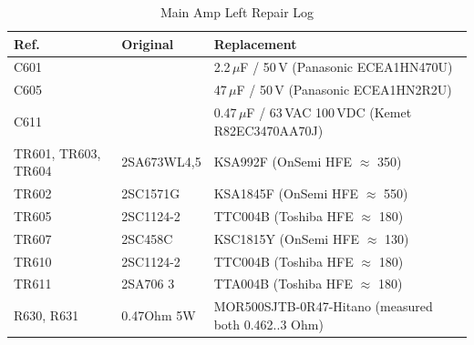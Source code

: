\documentclass[]{article}
\begin{document}
\begin{table}[H]
	\centering
	\caption{Main Amp Left Repair Log}
	\label{tab:repair_log_main_left}
	\begin{tabular}{|l|l|l|}
		\hline
		\textbf{Ref.} & \textbf{Original} & \textbf{Replacement} \\
		\hline
		C601 &  &   2.2\,$\mu$F / 50\,V (Panasonic ECEA1HN470U) \\
        C605 &  &   47\,$\mu$F / 50\,V (Panasonic ECEA1HN2R2U)\\ 
		C611 &  &   0.47\,$\mu$F / 63\,VAC 100\,VDC (Kemet R82EC3470AA70J) \\
        
		TR601, TR603, TR604 & 2SA673WL4,5 & KSA992F (OnSemi HFE $\approx$ 350) \\
                TR602 & 2SC1571G & KSA1845F (OnSemi HFE $\approx$ 550) \\
                TR605 & 2SC1124-2 & TTC004B (Toshiba HFE $\approx$ 180) \\
                TR607 & 2SC458C & KSC1815Y (OnSemi HFE $\approx$ 130)\\
                TR610 & 2SC1124-2 & TTC004B  (Toshiba HFE $\approx$ 180) \\
                TR611 & 2SA706 3 & TTA004B (Toshiba HFE $\approx$ 180) \\
                R630, R631 & 0.47Ohm 5W & MOR500SJTB-0R47-Hitano (measured both 0.462..3 Ohm) \\
                \hline
	\end{tabular}
\end{table}
\end{document}
